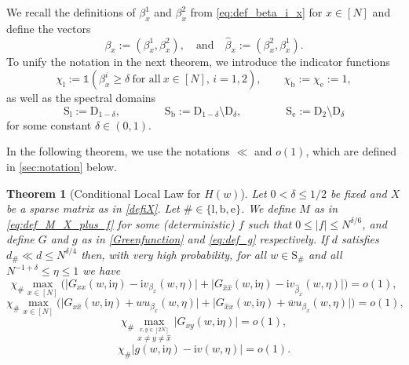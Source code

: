\documentclass[10pt,a4paper]{amsart}
\newcommand{\ii}{\mathrm{i}}
\newcommand{\abs}[1]{\left| #1 \right|}
\newcommand{\absb}[1]{\bigl| #1 \bigr|}
\newtheorem{thm}[thhm]{Theorem}
\numberwithin{equation}{section}
\newcommand*\ubarr[1]{{\widehat{#1}}}
\begin{document}
	We recall the definitions of $\beta_x^1$ and $\beta_x^2$ from \cref{eq:def_beta_i_x} for $x \in [N]$ and define the vectors 
	\[ \beta_x:= (\beta^1_x,\beta^2_x), \quad \text{and} \quad   \ubarr{\beta}_x := (\beta^2_x,\beta^1_x). \]
To unify the notation in the next theorem, we introduce the indicator functions 
\begin{equation} \label{eq:def_chi} 
	\chi_{\mathrm{l}}:= \mathds{1}\left( \beta_{x}^i \ge \delta~\text{for all}~ x\in [N],\, i =1,2\right), \qquad \chi_\mathrm{b} := \chi_\mathrm{e} := 1, 
	\end{equation} 
	as well as the spectral domains 
	\begin{equation} \label{eq:def_spectral} 
	\mathrm{S}_{\mathrm{l}} := \mathrm{D}_{1-\delta}, \qquad \qquad 
	\mathrm{S}_{\mathrm{b}} := 	\mathrm{D}_{1-\delta}\setminus \mathrm{D}_\delta, \qquad \qquad 
	\mathrm{S}_\mathrm{e} := \mathrm{D}_2\setminus \mathrm{D}_\delta 
	\end{equation} 
	for some constant $\delta \in (0,1)$. 
	
In the following theorem, we use the notations $\ll$ and $o(1)$, which are defined in \cref{sec:notation} below. 	


		\begin{thm}[Conditional Local Law for $H(w)$]\label{thm:locallaw_H}
		Let $ 0 < \delta \le 1/2$ be fixed and $X$ be a sparse matrix as in  \cref{defiX}. 
		Let $\# \in \{\mathrm{l}, \mathrm{b}, \mathrm{e}\}$.    
		We define $M$ as in \cref{eq:def_M_X_plus_f} for some (deterministic) $f$ such that $0 \le \abs{f} \le N^{\delta/6}$, and define $G$ and $g$ as in \cref{Greenfunction} and \cref{eq:def_g} respectively. 
		If $d$ satisfies $d_\# \ll d \leq N^{\delta/4}$ then, with very high probability, for all $w \in \mathrm{S}_\#$ and all $ N^{-1 + \delta} \le \eta \le 1$ we have
		\begin{equation}%
			\chi_\# \max_{x \in [N]} \Big( \absb{G_{xx}(w,\ii \eta) - \ii v_{\beta_x}(w,\eta)} +
			\absb{G_{\ubarr{x}\ubarr{x}}(w,\ii \eta) - \ii v_{\ubarr{\beta}_x}(w,\eta)}
			\Big) =o(1) ,
		\end{equation}
		\begin{equation}%
			\chi_\# \max_{x \in [N]} \Big(
			\absb{G_{x\ubarr{x}}(w,\ii\eta) + w u_{\beta_x}(w,\eta)} 
			+ \absb{G_{\ubarr{x}x}(w,\ii\eta) + \overline{w} u_{{\beta}_x}(w,\eta)} \Big)  =o(1),
		\end{equation}
		\begin{equation}%
			\chi_\#  \max_{\stackrel{x,y \in [2N]}{x \neq y \neq \ubarr{x}}}\absb{G_{xy}(w, \ii \eta)}  =o(1),
		\end{equation}
		\begin{equation}%
			\chi_\#  \absb{g(w,\ii \eta) - \ii v(w,\eta)}  =o(1).
		\end{equation}
	\end{thm}
\end{document}
